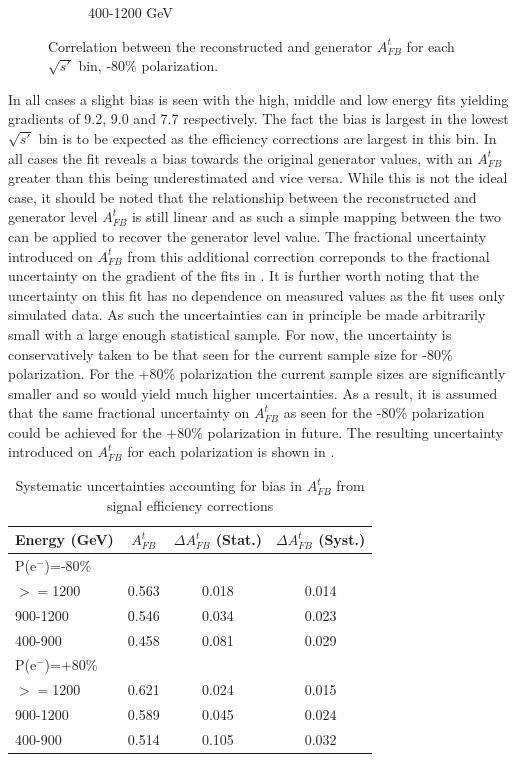 \begin{figure}
\begin{subfigure}{.6\textwidth}
    \caption{400-1200 GeV}
  \end{subfigure}
  \caption{Correlation between the reconstructed and generator $A_{FB}^t$ for each $\sqrt{s'}$ bin, -80\% polarization.}
  \label{fig:biassys}
\end{figure}

In all cases a slight bias is seen with the high, middle and low energy fits yielding gradients of 9.2, 9.0 and 7.7 respectively. The fact the bias is largest in the lowest $\sqrt{s'}$ bin is to be expected as the efficiency corrections are largest in this bin. In all cases the fit reveals a bias towards the original generator values, with an $A_{FB}^t$ greater than this being underestimated and vice versa. While this is not the ideal case, it should be noted that the relationship between the reconstructed and generator level $A_{FB}^t$ is still linear and as such a simple mapping between the two can be applied to recover the generator level value. The fractional uncertainty introduced on $A_{FB}^t$ from this additional correction correponds to the fractional uncertainty on the gradient of the fits in . It is further worth noting that the uncertainty on this fit has no dependence on measured values as the fit uses only simulated data. As such the uncertainties can in principle be made arbitrarily small with a large enough statistical sample. For now, the uncertainty is conservatively taken to be that seen for the current sample size for -80\% polarization. For the +80\% polarization the current sample sizes are significantly smaller and so would yield much higher uncertainties. As a result, it is assumed that the same fractional uncertainty on $A_{FB}^t$ as seen for the -80\% polarization could be achieved for the +80\% polarization in future. The resulting uncertainty introduced on $A_{FB}^t$ for each polarization is shown in .

\begin{table}
  \centering
  \begin{tabular}{l|c|c|c}
    \toprule
    Energy (GeV)& $A_{FB}^t$ & $\Delta A_{FB}^t$  (Stat.) & $\Delta A^t_{FB}$ (Syst.)  \\
    \midrule
    \midrule
    \multicolumn{4}{l}{P(e$^-$)=-80\%} \\
    \midrule
    \midrule
    $>=$1200   & 0.563 & 0.018 & 0.014\\
    \midrule
    900-1200   & 0.546 & 0.034 & 0.023\\
    \midrule
    400-900    & 0.458 & 0.081 & 0.029\\
    \midrule
    \midrule
    \multicolumn{4}{l}{ P(e$^-$)=+80\%}\\
    \midrule
    \midrule
    $>=$1200  & 0.621 & 0.024 & 0.015\\
    \midrule
    900-1200  & 0.589 & 0.045 & 0.024\\
    \midrule
    400-900   & 0.514 & 0.105 & 0.032\\
    \bottomrule
  \end{tabular}
  \caption{Systematic uncertainties accounting for bias in $A_{FB}^t$ from signal efficiency corrections}
  \label{tab:biassys}
\end{table}

